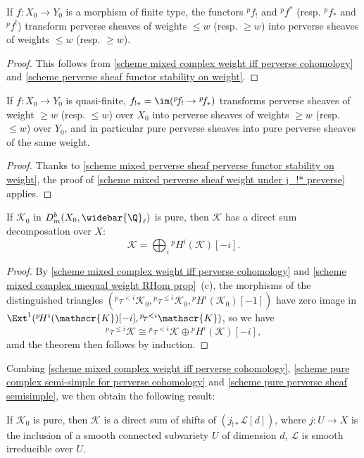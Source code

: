 \begin{corollary}\label{scheme mixed perverse sheaf perverse functor stability on weight}
If $f:X_0\to Y_0$ is a morphism of finite type, the functors ${^p\!f_!}$ and ${^p\!f^*}$ (resp. ${^p\!f_*}$ and ${^p\!f^!}$) transform perverse sheaves of weights $\leq w$ (resp. $\geq w$) into perverse sheaves of weights $\leq w$ (resp. $\geq w$).
\end{corollary}
\begin{proof}
This follows from \cref{scheme mixed complex weight iff perverse cohomology} and \cref{scheme perverse sheaf functor stability on weight}.
\end{proof}

\begin{corollary}\label{scheme mixed perverse sheaf quasi-finite f_!* on weight}
If $f:X_0\to Y_0$ is quasi-finite, $f_{!*}=\im({^p\!f_!}\to{^p\!f_*})$ transforms perverse sheaves of weight $\geq w$ (resp. $\leq w$) over $X_0$ into perverse sheaves of weights $\geq w$ (resp. $\leq w$) over $Y_0$, and in particular pure perverse sheaves into pure perverse sheaves of the same weight.
\end{corollary}
\begin{proof}
Thanks to \cref{scheme mixed perverse sheaf perverse functor stability on weight}, the proof of \cref{scheme mixed perverse sheaf weight under j_!* preverse} applies.
\end{proof}

\begin{theorem}\label{scheme pure complex semi-simple for perverse cohomology}
If $\mathscr{K}_0$ in $D^b_m(X_0,\widebar{\Q}_\ell)$ is pure, then $\mathscr{K}$ has a direct sum decomposation over $X$:
\[\mathscr{K}=\bigoplus_i{^p\!H^i(\mathscr{K})[-i]}.\]
\end{theorem}
\begin{proof}
By \cref{scheme mixed complex weight iff perverse cohomology} and \cref{scheme mixed complex unequal weight RHom prop}~(c), the morphisms of the distinguished triangles $({^p\!\tau^{<i}\mathscr{K}_0},{^p\!\tau^{\leq i}\mathscr{K}_0},{^p\!H^i(\mathscr{K}_0)[-1]})$ have zero image in $\Ext^1({^p\!H^i(\mathscr{K})[-i]},{^p\!\tau^{<i}\mathscr{K}})$, so we have
\[{^p\!\tau^{\leq i}\mathscr{K}}\cong {^p\!\tau^{<i}\mathscr{K}}\oplus {^p\!H^i(\mathscr{K})}[-i],\]
amd the theorem then follows by induction.
\end{proof}

Combing \cref{scheme mixed complex weight iff perverse cohomology}, \cref{scheme pure complex semi-simple for perverse cohomology} and \cref{scheme pure perverse sheaf semisimple}, we then obtain the following result:

\begin{corollary}\label{scheme pure complex decomposition}
If $\mathscr{K}_0$ is pure, then $\mathscr{K}$ is a direct sum of shifts of $(j_{!*}\mathscr{L}[d])$, where $j:U\to X$ is the inclusion of a smooth connected subvariety $U$ of dimension $d$, $\mathscr{L}$ is smooth irreducible over $U$. 
\end{corollary}



